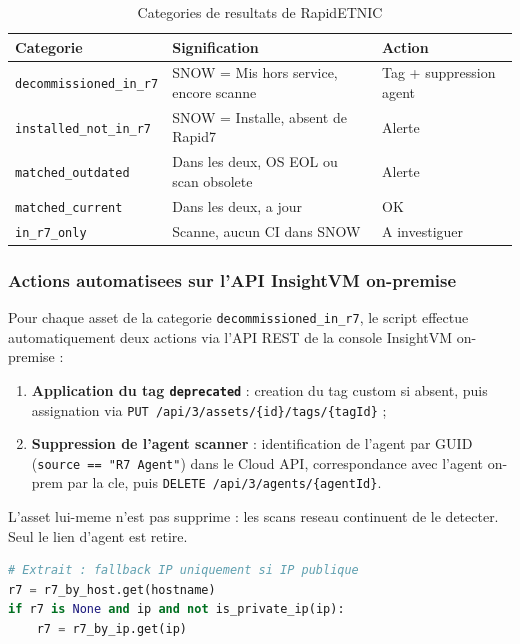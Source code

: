 \documentclass{rapport}
\begin{document}
\begin{table}[H]
\centering
\begin{tabularx}{\linewidth}{lXl}
\toprule
\textbf{Categorie} & \textbf{Signification} & \textbf{Action} \\
\midrule
\texttt{decommissioned\_in\_r7} & SNOW = Mis hors service, encore scanne
  & Tag + suppression agent \\
\texttt{installed\_not\_in\_r7} & SNOW = Installe, absent de Rapid7
  & Alerte \\
\texttt{matched\_outdated}      & Dans les deux, OS EOL ou scan obsolete
  & Alerte \\
\texttt{matched\_current}       & Dans les deux, a jour
  & OK \\
\texttt{in\_r7\_only}           & Scanne, aucun CI dans SNOW
  & A investiguer \\
\bottomrule
\end{tabularx}
\caption{Categories de resultats de RapidETNIC}
\end{table}

\subsubsection{Actions automatisees sur l'API InsightVM on-premise}

Pour chaque asset de la categorie \texttt{decommissioned\_in\_r7}, le
script effectue automatiquement deux actions via l'API REST de la console
InsightVM on-premise :

\begin{enumerate}
  \item \textbf{Application du tag \texttt{deprecated}} : creation du tag
        custom si absent, puis assignation via
        \texttt{PUT /api/3/assets/\{id\}/tags/\{tagId\}} ;
  \item \textbf{Suppression de l'agent scanner} : identification de l'agent
        par GUID (\texttt{source == "R7 Agent"}) dans le Cloud API,
        correspondance avec l'agent on-prem par la cle, puis
        \texttt{DELETE /api/3/agents/\{agentId\}}.
\end{enumerate}

L'asset lui-meme n'est pas supprime : les scans reseau continuent de le
detecter. Seul le lien d'agent est retire.

\begin{lstlisting}[language=Python, basicstyle=\ttfamily\small, backgroundcolor=\color{codebg}, frame=single]
# Extrait : fallback IP uniquement si IP publique
r7 = r7_by_host.get(hostname)
if r7 is None and ip and not is_private_ip(ip):
    r7 = r7_by_ip.get(ip)
\end{lstlisting}
\end{document}
